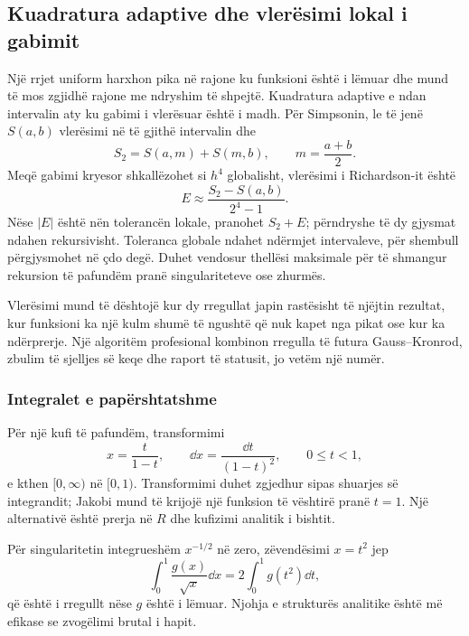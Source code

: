 \subsection{Kuadratura adaptive dhe vlerësimi lokal i gabimit}
Një rrjet uniform harxhon pika në rajone ku funksioni është i lëmuar dhe mund të mos zgjidhë rajone me ndryshim të shpejtë. Kuadratura adaptive e ndan intervalin aty ku gabimi i vlerësuar është i madh. Për Simpsonin, le të jenë $S(a,b)$ vlerësimi në të gjithë intervalin dhe
\begin{equation}
 S_2=S(a,m)+S(m,b),\qquad m=\frac{a+b}{2}.
\end{equation}
Meqë gabimi kryesor shkallëzohet si $h^4$ globalisht, vlerësimi i Richardson-it është
\begin{equation}
 E\approx\frac{S_2-S(a,b)}{2^4-1}.
\end{equation}
Nëse $|E|$ është nën tolerancën lokale, pranohet $S_2+E$; përndryshe të dy gjysmat ndahen rekursivisht. Toleranca globale ndahet ndërmjet intervaleve, për shembull përgjysmohet në çdo degë. Duhet vendosur thellësi maksimale për të shmangur rekursion të pafundëm pranë singulariteteve ose zhurmës.

Vlerësimi mund të dështojë kur dy rregullat japin rastësisht të njëjtin rezultat, kur funksioni ka një kulm shumë të ngushtë që nuk kapet nga pikat ose kur ka ndërprerje. Një algoritëm profesional kombinon rregulla të futura Gauss--Kronrod, zbulim të sjelljes së keqe dhe raport të statusit, jo vetëm një numër.

\subsubsection{Integralet e papërshtatshme}
Për një kufi të pafundëm, transformimi
\begin{equation}
 x=\frac{t}{1-t},\qquad \dd x=\frac{\dd t}{(1-t)^2},\qquad 0\le t<1,
\end{equation}
e kthen $[0,\infty)$ në $[0,1)$. Transformimi duhet zgjedhur sipas shuarjes së integrandit; Jakobi mund të krijojë një funksion të vështirë pranë $t=1$. Një alternativë është prerja në $R$ dhe kufizimi analitik i bishtit.

Për singularitetin integrueshëm $x^{-1/2}$ në zero, zëvendësimi $x=t^2$ jep
\begin{equation}
 \int_0^1\frac{g(x)}{\sqrt x}\dd x
 =2\int_0^1g(t^2)\dd t,
\end{equation}
që është i rregullt nëse $g$ është i lëmuar. Njohja e strukturës analitike është më efikase se zvogëlimi brutal i hapit.

